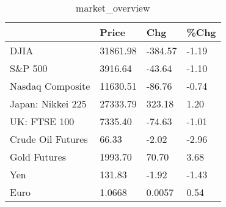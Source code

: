 \documentclass{article}%
\begin{document}
%


\begin{table}[htbp]%
\caption{market\_overview}%
\centering%
\begin{adjustbox}{width=1\textwidth}%
\begin{tabular}{llll}
\toprule
                  &    Price &     Chg &  \%Chg \\
\midrule
             DJIA & 31861.98 & -384.57 & -1.19 \\
          S\&P 500 &  3916.64 &  -43.64 & -1.10 \\
 Nasdaq Composite & 11630.51 &  -86.76 & -0.74 \\
Japan: Nikkei 225 & 27333.79 &  323.18 &  1.20 \\
     UK: FTSE 100 &  7335.40 &  -74.63 & -1.01 \\
Crude Oil Futures &    66.33 &   -2.02 & -2.96 \\
     Gold Futures &  1993.70 &   70.70 &  3.68 \\
              Yen &   131.83 &   -1.92 & -1.43 \\
             Euro &   1.0668 &  0.0057 &  0.54 \\
\bottomrule
\end{tabular}
%
\end{adjustbox}%
\end{table}

%
\end{document}
